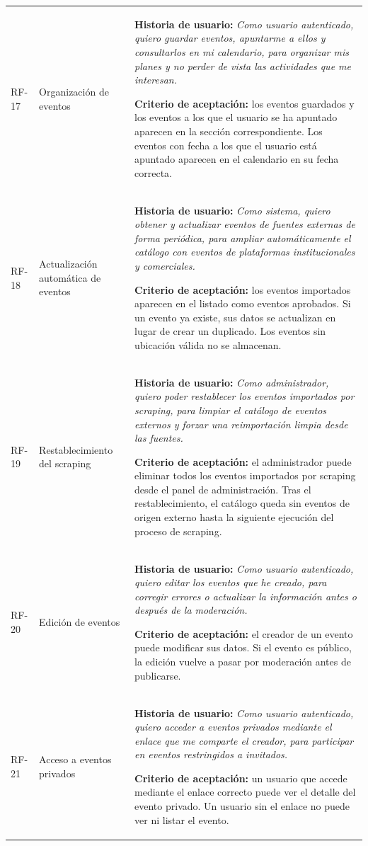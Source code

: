 {\begin{longtable}{@{}>{\raggedright\arraybackslash}p{} >{\raggedright\arraybackslash}p{} >{\raggedright\arraybackslash}p{}@{}}
\addlinespace
RF-17 & Organización de eventos & \textbf{Historia de usuario:} \textit{Como usuario autenticado, quiero guardar eventos, apuntarme a ellos y consultarlos en mi calendario, para organizar mis planes y no perder de vista las actividades que me interesan.}\par\vspace{0.05cm}\textbf{Criterio de aceptación:} los eventos guardados y los eventos a los que el usuario se ha apuntado aparecen en la sección correspondiente. Los eventos con fecha a los que el usuario está apuntado aparecen en el calendario en su fecha correcta. \\
\addlinespace
RF-18 & Actualización automática de eventos & \textbf{Historia de usuario:} \textit{Como sistema, quiero obtener y actualizar eventos de fuentes externas de forma periódica, para ampliar automáticamente el catálogo con eventos de plataformas institucionales y comerciales.}\par\vspace{0.05cm}\textbf{Criterio de aceptación:} los eventos importados aparecen en el listado como eventos aprobados. Si un evento ya existe, sus datos se actualizan en lugar de crear un duplicado. Los eventos sin ubicación válida no se almacenan. \\
\addlinespace
RF-19 & Restablecimiento del scraping & \textbf{Historia de usuario:} \textit{Como administrador, quiero poder restablecer los eventos importados por scraping, para limpiar el catálogo de eventos externos y forzar una reimportación limpia desde las fuentes.}\par\vspace{0.05cm}\textbf{Criterio de aceptación:} el administrador puede eliminar todos los eventos importados por scraping desde el panel de administración. Tras el restablecimiento, el catálogo queda sin eventos de origen externo hasta la siguiente ejecución del proceso de scraping. \\
\addlinespace
RF-20 & Edición de eventos & \textbf{Historia de usuario:} \textit{Como usuario autenticado, quiero editar los eventos que he creado, para corregir errores o actualizar la información antes o después de la moderación.}\par\vspace{0.05cm}\textbf{Criterio de aceptación:} el creador de un evento puede modificar sus datos. Si el evento es público, la edición vuelve a pasar por moderación antes de publicarse. \\
\addlinespace
RF-21 & Acceso a eventos privados & \textbf{Historia de usuario:} \textit{Como usuario autenticado, quiero acceder a eventos privados mediante el enlace que me comparte el creador, para participar en eventos restringidos a invitados.}\par\vspace{0.05cm}\textbf{Criterio de aceptación:} un usuario que accede mediante el enlace correcto puede ver el detalle del evento privado. Un usuario sin el enlace no puede ver ni listar el evento. \\
\end{longtable}
}

